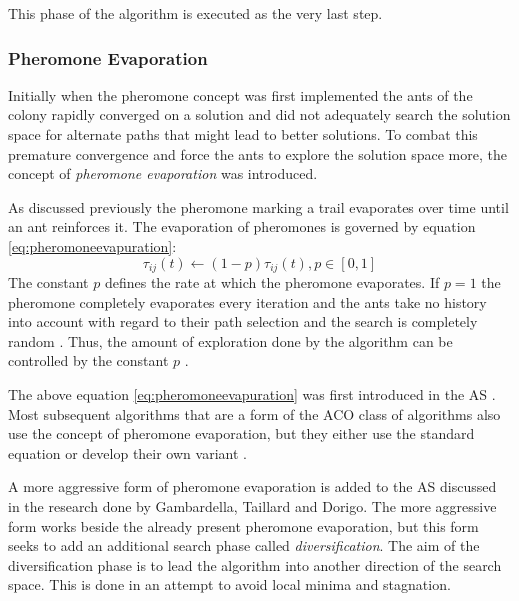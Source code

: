 This phase of the algorithm is executed as the very last step.

\subsubsection{Pheromone Evaporation}
\label{sec:pheromoneevapuation}
Initially when the pheromone concept was first implemented the ants of the colony rapidly converged on a solution and did not adequately search the solution space for alternate paths that might lead to better solutions. To combat this premature convergence and force the ants to explore the solution space more, the concept of \emph{pheromone evaporation} was introduced\cite{CompuIntelligenceIntro,AntsAndStigmergy,AntIntroTrends,AntSurvey}. 

As discussed previously the pheromone marking a trail evaporates over time until an ant reinforces it. The evaporation of pheromones is governed by equation \ref{eq:pheromoneevapuration}\cite{CompuIntelligenceIntro,AntsAndStigmergy,AntIntroTrends,AntSurvey}:
\begin{equation}
\label{eq:pheromoneevapuration}
	\tau_{ij}(t) \leftarrow (1-p)\tau_{ij}(t), p\in [0,1]
\end{equation}
The constant $p$ defines the rate at which the pheromone evaporates. If $p=1$ the pheromone completely evaporates every iteration and the ants take no history into account with regard to their path selection and the search is completely random \cite{CompuIntelligenceIntro,AntsAndStigmergy}. Thus, the amount of exploration done by the algorithm can be controlled by the constant $p$ \cite{CompuIntelligenceIntro,AntsAndStigmergy}.

The above equation \ref{eq:pheromoneevapuration} was first introduced in the AS \cite{CompuIntelligenceIntro,AntsAndStigmergy,AntIntroTrends,AntSurvey}. Most subsequent algorithms that are a form of the ACO class of algorithms also use the concept of pheromone evaporation, but they either use the standard equation or develop their own variant \cite{CompuIntelligenceIntro,AntsAndStigmergy,AntIntroTrends,AntSurvey}.

A more aggressive form of pheromone evaporation  is added to the AS discussed in the research done by Gambardella, Taillard and Dorigo\cite{AntQAP}. The more aggressive form works beside the already present pheromone evaporation, but this form seeks to add an additional search phase called \emph{diversification}\cite{AntQAP}. The aim of the diversification phase is to lead the algorithm into another direction of the search space\cite{AntQAP}. This is done in an attempt to avoid local minima and stagnation\cite{AntQAP}.

